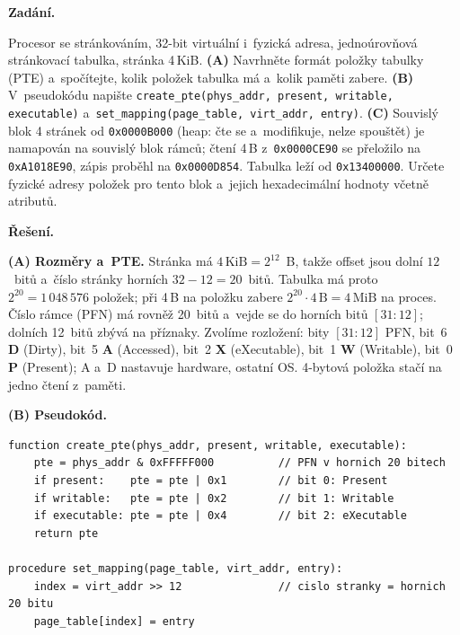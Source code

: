 \begin{priklad}
\par
\textbf{Zadání.}\par
Procesor se stránkováním, 32-bit virtuální i~fyzická adresa, jednoúrovňová stránkovací tabulka, stránka 4\,KiB. \textbf{(A)} Navrhněte formát položky tabulky (PTE) a~spočítejte, kolik položek tabulka má a~kolik paměti zabere. \textbf{(B)} V~pseudokódu napište \texttt{create\_pte(phys\_addr, present, writable, executable)} a~\texttt{set\_mapping(page\_table, virt\_addr, entry)}. \textbf{(C)} Souvislý blok 4 stránek od \texttt{0x0000B000} (heap: čte se a~modifikuje, nelze spouštět) je namapován na souvislý blok rámců; čtení 4\,B z~\texttt{0x0000CE90} se přeložilo na \texttt{0xA1018E90}, zápis proběhl na \texttt{0x0000D854}. Tabulka leží od \texttt{0x13400000}. Určete fyzické adresy položek pro tento blok a~jejich hexadecimální hodnoty včetně atributů.

\medskip
\textbf{Řešení.}\par
\textbf{(A) Rozměry a~PTE.} Stránka má $4\,\text{KiB}=2^{12}$~B, takže offset jsou dolní $\boxed{12}$~bitů a~číslo stránky horních $32-12=\boxed{20}$~bitů. Tabulka má proto $2^{20}=\boxed{1\,048\,576}$ položek; při 4\,B na položku zabere $2^{20}\cdot4\,\text{B}=\boxed{4\,\text{MiB}}$ na proces. Číslo rámce (PFN) má rovněž 20~bitů a~vejde se do horních bitů $[31{:}12]$; dolních 12~bitů zbývá na příznaky. Zvolíme rozložení: bity $[31{:}12]$ PFN, bit~6 \textbf{D} (Dirty), bit~5 \textbf{A} (Accessed), bit~2 \textbf{X} (eXecutable), bit~1 \textbf{W} (Writable), bit~0 \textbf{P} (Present); A a~D nastavuje hardware, ostatní OS. 4-bytová položka stačí na jedno čtení z~paměti.

\textbf{(B) Pseudokód.}
\begin{lstlisting}
function create_pte(phys_addr, present, writable, executable):
    pte = phys_addr & 0xFFFFF000          // PFN v hornich 20 bitech
    if present:    pte = pte | 0x1        // bit 0: Present
    if writable:   pte = pte | 0x2        // bit 1: Writable
    if executable: pte = pte | 0x4        // bit 2: eXecutable
    return pte

procedure set_mapping(page_table, virt_addr, entry):
    index = virt_addr >> 12               // cislo stranky = hornich 20 bitu
    page_table[index] = entry
\end{lstlisting}


\end{priklad}

